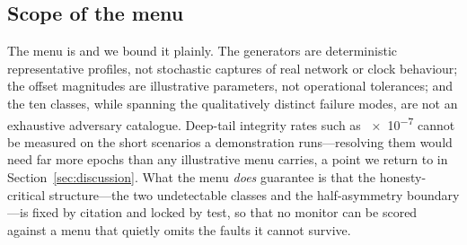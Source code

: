 \subsection{Scope of the menu}
\label{sec:menuscope}

The menu is \Modelled{} and we bound it plainly. The generators are deterministic
representative profiles, not stochastic captures of real network or clock
behaviour; the offset magnitudes are illustrative parameters, not operational
tolerances; and the ten classes, while spanning the qualitatively distinct failure
modes, are not an exhaustive adversary catalogue. Deep-tail integrity rates such as
\num{e-7} cannot be measured on the short scenarios a demonstration runs---resolving
them would need far more epochs than any illustrative menu carries, a point we
return to in Section~\ref{sec:discussion}. What the menu \emph{does} guarantee is
that the honesty-critical structure---the two undetectable classes and the
half-asymmetry boundary---is fixed by citation and locked by test, so that no
monitor can be scored against a menu that quietly omits the faults it cannot
survive.
